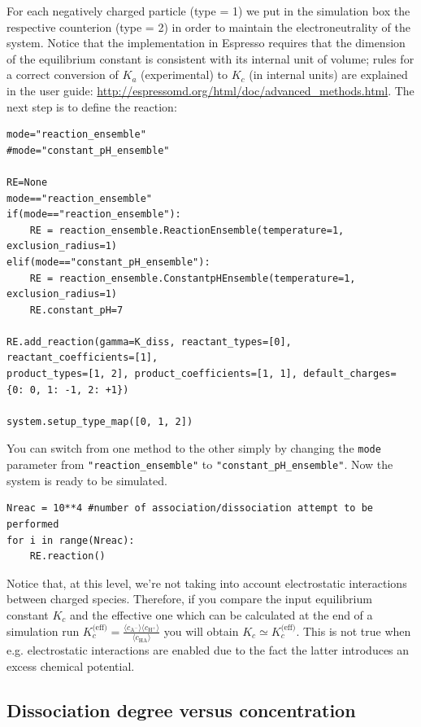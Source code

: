 \documentclass[
a4paper,                        %
11pt,                           %
twoside,                        %
footsepline,                    %
headsepline,                    %
headexclude,                    %
footexclude,                    %
pagesize,                       %
]{scrartcl}
\begin{document}
For each negatively charged  particle (type = 1) we put in the simulation box the respective counterion  (type = 2) in order to maintain the electroneutrality of the system.
Notice that the implementation in Espresso requires that the dimension of the equilibrium constant is consistent with its internal unit of volume; rules for a correct conversion of $K_a$ (experimental) to $K_c$ (in internal units) are explained in the user guide: \url{http://espressomd.org/html/doc/advanced_methods.html}. The next step is to define the reaction:

\begin{verbatim}
mode="reaction_ensemble"
#mode="constant_pH_ensemble"

RE=None
mode=="reaction_ensemble"
if(mode=="reaction_ensemble"):
    RE = reaction_ensemble.ReactionEnsemble(temperature=1, exclusion_radius=1)
elif(mode=="constant_pH_ensemble"):
    RE = reaction_ensemble.ConstantpHEnsemble(temperature=1, exclusion_radius=1)
    RE.constant_pH=7
    
RE.add_reaction(gamma=K_diss, reactant_types=[0], reactant_coefficients=[1], 
product_types=[1, 2], product_coefficients=[1, 1], default_charges=
{0: 0, 1: -1, 2: +1})

system.setup_type_map([0, 1, 2])
\end{verbatim}
You can switch from one method to the other simply by changing the \texttt{mode} parameter from \texttt{"reaction\_ensemble"} to \texttt{"constant\_pH\_ensemble"}. Now the system is ready to be simulated.

\begin{verbatim}
Nreac = 10**4 #number of association/dissociation attempt to be performed
for i in range(Nreac):
    RE.reaction()
\end{verbatim}
Notice that, at this level, we're not taking into account electrostatic interactions between charged species. Therefore, if you compare the input equilibrium constant $K_c$ and the effective one which can be calculated at the end of a simulation run $K_c^{\text{(eff)}} = \frac{\langle c_{\text{A}^-} \rangle \langle c_{\text{H}^+} \rangle }{\langle c_\text{HA} \rangle}$ you will obtain $K_c \simeq K_c^\text{(eff)}$. This is not true when e.g. electrostatic interactions are enabled due to the fact the latter introduces an excess chemical potential.


\subsection{Dissociation degree versus concentration}
\end{document}

